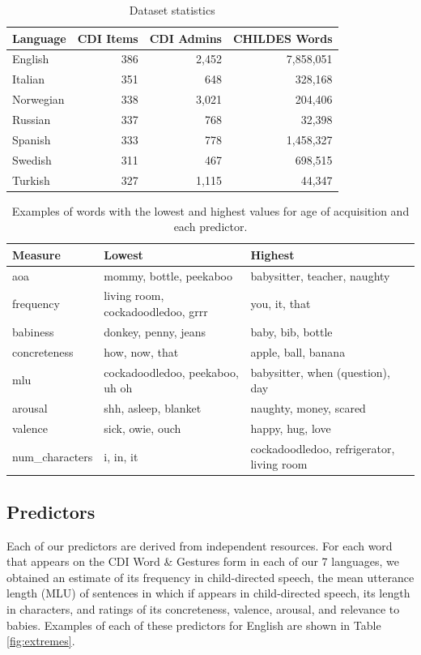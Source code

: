 \documentclass[10pt, letterpaper]{article}
\begin{document}
\begin{table}[t]
\centering
\begin{tabular}{lrrr}
  \hline
Language & CDI Items & CDI Admins & CHILDES Words \\ 
  \hline
English & 386 & 2,452 & 7,858,051 \\ 
  Italian & 351 & 648 & 328,168 \\ 
  Norwegian & 338 & 3,021 & 204,406 \\ 
  Russian & 337 & 768 & 32,398 \\ 
  Spanish & 333 & 778 & 1,458,327 \\ 
  Swedish & 311 & 467 & 698,515 \\ 
  Turkish & 327 & 1,115 & 44,347 \\ 
   \hline
\end{tabular}
\caption{Dataset statistics} 
\end{table}

\begin{table}[t]
\centering
\begin{tabular}{lll}
  \hline
Measure & Lowest & Highest \\ 
  \hline
aoa & mommy, bottle, peekaboo & babysitter, teacher, naughty \\ 
  frequency & living room, cockadoodledoo, grrr & you, it, that \\ 
  babiness & donkey, penny, jeans & baby, bib, bottle \\ 
  concreteness & how, now, that & apple, ball, banana \\ 
  mlu & cockadoodledoo, peekaboo, uh oh & babysitter, when (question), day \\ 
  arousal & shh, asleep, blanket & naughty, money, scared \\ 
  valence & sick, owie, ouch & happy, hug, love \\ 
  num\_characters & i, in, it & cockadoodledoo, refrigerator, living room \\ 
   \hline
\end{tabular}
\caption{Examples of words with the lowest and highest values for age of acquisition and each predictor.} 
\end{table}

\subsection{Predictors}\label{predictors}

Each of our predictors are derived from independent resources. For each
word that appears on the CDI Word \& Gestures form in each of our 7
languages, we obtained an estimate of its frequency in child-directed
speech, the mean utterance length (MLU) of sentences in which if appears
in child-directed speech, its length in characters, and ratings of its
concreteness, valence, arousal, and relevance to babies. Examples of
each of these predictors for English are shown in Table
\ref{fig:extremes}.
\end{document}
